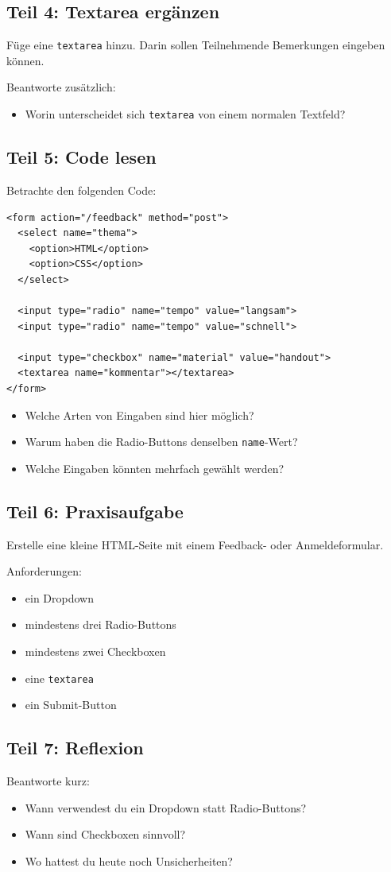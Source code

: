 \documentclass[a4paper,12pt]{article}
\begin{document}
\subsection*{Teil 4: Textarea ergänzen}
Füge eine \texttt{textarea} hinzu.
Darin sollen Teilnehmende Bemerkungen eingeben können.

Beantworte zusätzlich:
\begin{itemize}
  \item Worin unterscheidet sich \texttt{textarea} von einem normalen Textfeld?
\end{itemize}

\subsection*{Teil 5: Code lesen}
Betrachte den folgenden Code:

\begin{verbatim}
<form action="/feedback" method="post">
  <select name="thema">
    <option>HTML</option>
    <option>CSS</option>
  </select>

  <input type="radio" name="tempo" value="langsam">
  <input type="radio" name="tempo" value="schnell">

  <input type="checkbox" name="material" value="handout">
  <textarea name="kommentar"></textarea>
</form>
\end{verbatim}

\begin{itemize}
  \item Welche Arten von Eingaben sind hier möglich?
  \item Warum haben die Radio-Buttons denselben \texttt{name}-Wert?
  \item Welche Eingaben könnten mehrfach gewählt werden?
\end{itemize}

\subsection*{Teil 6: Praxisaufgabe}
Erstelle eine kleine HTML-Seite mit einem Feedback- oder Anmeldeformular.

Anforderungen:
\begin{itemize}
  \item ein Dropdown
  \item mindestens drei Radio-Buttons
  \item mindestens zwei Checkboxen
  \item eine \texttt{textarea}
  \item ein Submit-Button
\end{itemize}

\subsection*{Teil 7: Reflexion}
Beantworte kurz:
\begin{itemize}
  \item Wann verwendest du ein Dropdown statt Radio-Buttons?
  \item Wann sind Checkboxen sinnvoll?
  \item Wo hattest du heute noch Unsicherheiten?
\end{itemize}
\end{document}
